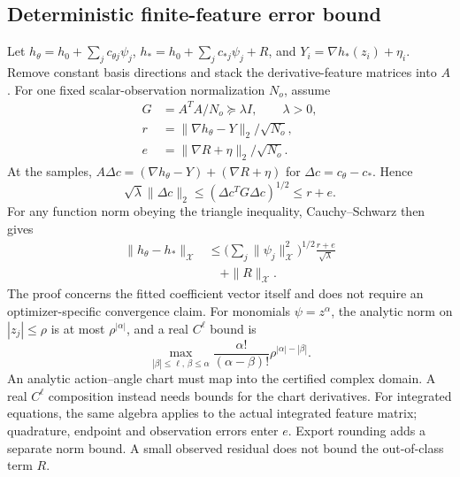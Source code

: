 \subsection{Deterministic finite-feature error bound}
Let $h_\theta=h_0+\sum_jc_{\theta j}\psi_j$, $h_*=h_0+\sum_jc_{*j}\psi_j+R$, and $Y_i=\nabla h_*(z_i)+\eta_i$. Remove constant basis directions and stack the derivative-feature matrices into $A$. For one fixed scalar-observation normalization $N_o$, assume
\begin{equation}
 \begin{aligned}
 G&=A^TA/N_o\succeq\lambda I,\qquad\lambda>0,\\
 r&=\|\nabla h_\theta-Y\|_2/\sqrt{N_o},\\
 e&=\|\nabla R+\eta\|_2/\sqrt{N_o}.
 \end{aligned}
 \label{eq:supp-learn-gram-definitions}
\end{equation}
At the samples, $A\Delta c=(\nabla h_\theta-Y)+(\nabla R+\eta)$ for $\Delta c=c_\theta-c_*$. Hence
\begin{equation}
 \sqrt\lambda\|\Delta c\|_2
 \le(\Delta c^TG\Delta c)^{1/2}\le r+e.
 \label{eq:supp-learn-coefficient-proof}
\end{equation}
For any function norm obeying the triangle inequality, Cauchy--Schwarz then gives
\begin{equation}
 \begin{aligned}
 \|h_\theta-h_*\|_{\mathcal X}
 &\le\Big(\sum_j\|\psi_j\|_{\mathcal X}^2\Big)^{1/2}
       \frac{r+e}{\sqrt\lambda}\\
 &\quad+\|R\|_{\mathcal X}.
 \end{aligned}
 \label{eq:supp-learn-gram-conclusion}
\end{equation}
The proof concerns the fitted coefficient vector itself and does not require an optimizer-specific convergence claim. For monomials $\psi=z^\alpha$, the analytic norm on $|z_j|\le\rho$ is at most $\rho^{|\alpha|}$, and a real $C^\ell$ bound is
\begin{equation}
 \max_{|\beta|\le\ell,\,\beta\le\alpha}
 \frac{\alpha!}{(\alpha-\beta)!}\rho^{|\alpha|-|\beta|}.
 \label{eq:supp-learn-monomial-bound}
\end{equation}
An analytic action--angle chart must map into the certified complex domain. A real $C^\ell$ composition instead needs bounds for the chart derivatives. For integrated equations, the same algebra applies to the actual integrated feature matrix; quadrature, endpoint and observation errors enter $e$. Export rounding adds a separate norm bound. A small observed residual does not bound the out-of-class term $R$.

